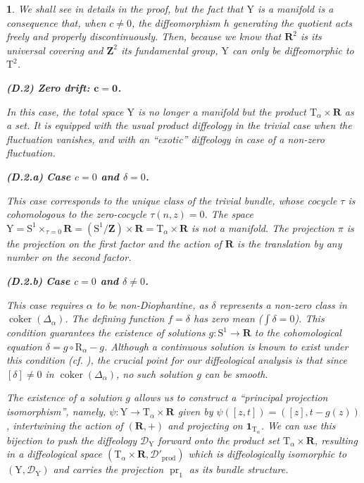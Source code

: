 \documentclass[10pt,letterpaper,reqno]{amsart}
\theoremstyle{article}
\newtheorem{article}[subsection]{}
\newcommand{\1}{{\hat 1}}
\newcommand{\0}{{\hat 0}}
\newcommand{\RR}{\mathbf R}
\newcommand{\ZZ}{\mathbf Z}
\newcommand{\cD}{{\mathcal D}}
\def \R{\mathrm R}
\def \S{\mathrm S}
\def \T{\mathrm T}
\def \Y{\mathrm Y}
\newcommand{\coker}{\operatorname{coker}}
\newcommand{\cl}[1]{\left[ #1 \right]}
\newcommand{\id}{\mathbf 1}
\newcommand{\pr}{\operatorname{pr}}
\newcommand{\product}{\mathrm{prod}}
\begin{document}
\begin{article}
    We shall see in details in the proof,
    but the fact that $\Y$ is a manifold is a consequence that,
    when $c \ne 0$,
    the diffeomorphism $h$ generating the quotient acts freely and properly discontinuously.
    Then,
    because we know that $\RR^2$ is its universal covering and $\ZZ^2$ its fundamental group,
    $\Y$ can only be diffeomorphic to $\T^2$.
    
    \medskip\textbf{(D.2) Zero drift: $\mathbf{c = 0}$.}
    
    In this case,
    the total space $\Y$ is no longer a manifold but the product $\T_\alpha \times \RR$ as a set.
    It is equipped with the usual product diffeology in the trivial case when the fluctuation vanishes,
    and with an ``exotic'' diffeology in case of a non-zero fluctuation.
    
    \smallskip\textbf{(D.2.a)} \textbf{Case $c = 0$ and $\delta = 0$.}
    
    This case corresponds to the unique class of the trivial bundle,
    whose cocycle $\tau$ is cohomologous to the zero-cocycle $\tau(n,z) = 0$.
    The space $\Y = \S^1 \times_{\tau = 0} \RR = (\S^1/\ZZ) \times \RR = \T_\alpha \times \RR$ is not a manifold.
    The projection $\pi$ is the projection on the first factor and the action of $\RR$ is the translation by any number on the second factor.
    
    \smallskip\textbf{(D.2.b)} \textbf{Case $c=0$ and $\delta \ne 0$.}
    
    This case requires $\alpha$ to be non-Diophantine,
    as $\delta$ represents a non-zero class in $\coker(\Delta_\alpha)$.
    The defining function $f=\delta$ has zero mean ($\int \delta = 0$).
    This condition guarantees the existence of solutions $g: \S^1 \to \RR$ to the cohomological equation $\delta = g \circ \R_\alpha - g$.
    Although a continuous solution is known to exist under this condition (cf. \cite{KH95}),
    the crucial point for our diffeological analysis is that since $\cl{\delta} \ne 0$ in $\coker(\Delta_\alpha)$,
    no such solution $g$ can be smooth.
    
    The existence of a solution $g$ allows us to construct a ``principal projection isomorphism'',
    namely,
    $\psi: \Y \to \T_\alpha \times \RR$ given by $\psi(\cl{z,t}) = (\cl{z}, t - g(z))$,
    intertwining the action of $(\RR,+)$ and projecting on $\id_{\T_\alpha}$.
    We can use this bijection to push the diffeology $\cD_\Y$ forward onto the product set $\T_\alpha \times \RR$,
    resulting in a diffeological space $(\T_\alpha \times \RR, \cD'_{\product})$ which is diffeologically isomorphic to $(\Y, \cD_\Y)$ and carries the projection $\pr_1$ as its bundle structure.
    

\end{article}
\end{document}
